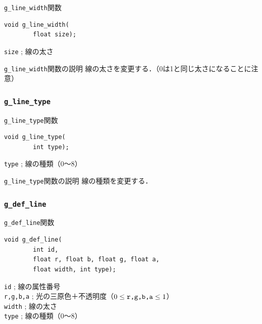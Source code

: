 \documentclass[platex,a4paper,12pt]{jsarticle}%
\begin{document}
\begin{itembox}[l]{\texttt{g\_line\_width}関数}
\begin{verbatim}
void g_line_width(
        float size);
\end{verbatim}
\verb|size| ; 線の太さ
\end{itembox}

\begin{itembox}[l]{\texttt{g\_line\_width}関数の説明}
線の太さを変更する．（0は1と同じ太さになることに注意）
\end{itembox}

\subsubsection{\texttt{g\_line\_type}}

\begin{itembox}[l]{\texttt{g\_line\_type}関数}
\begin{verbatim}
void g_line_type(
        int type);
\end{verbatim}
\verb|type| ; 線の種類（0〜8）
\end{itembox}

\begin{itembox}[l]{\texttt{g\_line\_type}関数の説明}
線の種類を変更する．
\end{itembox}

\begin{figure}[htb]
\end{figure}



\clearpage
\subsubsection{\texttt{g\_def\_line}}

\begin{itembox}[l]{\texttt{g\_def\_line}関数}
\begin{verbatim}
void g_def_line(
        int id,	
        float r, float b, float g, float a,
        float width, int type);
\end{verbatim}
\verb|id| ; 線の属性番号\\
\verb|r,g,b,a| ; 光の三原色＋不透明度（$0\leq \verb|r,g,b,a| \leq 1$）\\
\verb|width| ; 線の太さ\\
\verb|type| ; 線の種類（0〜8）
\end{itembox}
\end{document}
